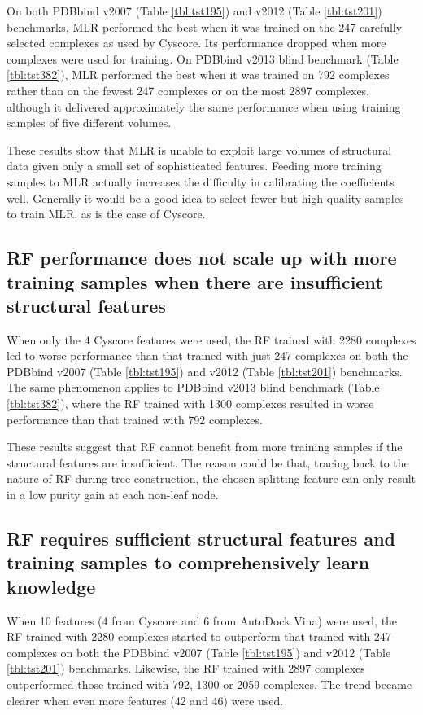\documentclass[journal=jacsat,manuscript=article]{achemso}
\begin{document}
On both PDBbind v2007 (Table \ref{tbl:tst195}) and v2012 (Table \ref{tbl:tst201}) benchmarks, MLR performed the best when it was trained on the 247 carefully selected complexes as used by Cyscore. Its performance dropped when more complexes were used for training. On PDBbind v2013 blind benchmark (Table \ref{tbl:tst382}), MLR performed the best when it was trained on 792 complexes rather than on the fewest 247 complexes or on the most 2897 complexes, although it delivered approximately the same performance when using training samples of five different volumes.

These results show that MLR is unable to exploit large volumes of structural data given only a small set of sophisticated features. Feeding more training samples to MLR actually increases the difficulty in calibrating the coefficients well. Generally it would be a good idea to select fewer but high quality samples to train MLR, as is the case of Cyscore.

\subsection{RF performance does not scale up with more training samples when there are insufficient structural features}

When only the 4 Cyscore features were used, the RF trained with 2280 complexes led to worse performance than that trained with just 247 complexes on both the PDBbind v2007 (Table \ref{tbl:tst195}) and v2012 (Table \ref{tbl:tst201}) benchmarks. The same phenomenon applies to PDBbind v2013 blind benchmark (Table \ref{tbl:tst382}), where the RF trained with 1300 complexes resulted in worse performance than that trained with 792 complexes.

These results suggest that RF cannot benefit from more training samples if the structural features are insufficient. The reason could be that, tracing back to the nature of RF during tree construction, the chosen splitting feature can only result in a low purity gain at each non-leaf node.

\subsection{RF requires sufficient structural features and training samples to comprehensively learn knowledge}

When 10 features (4 from Cyscore and 6 from AutoDock Vina) were used, the RF trained with 2280 complexes started to outperform that trained with 247 complexes on both the PDBbind v2007 (Table \ref{tbl:tst195}) and v2012 (Table \ref{tbl:tst201}) benchmarks. Likewise, the RF trained with 2897 complexes outperformed those trained with 792, 1300 or 2059 complexes. The trend became clearer when even more features (42 and 46) were used.
\end{document}
